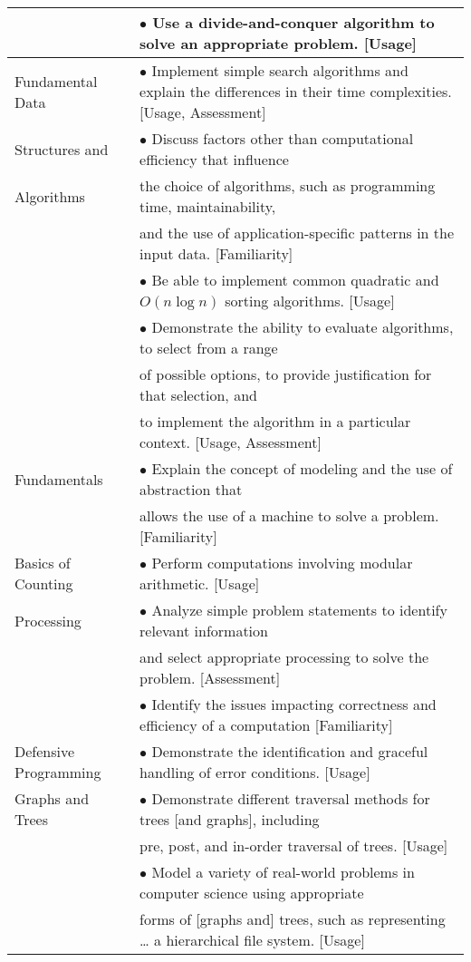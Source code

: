 \documentclass[10pt]{article}
\begin{document}
\begin{longtable}{|p{1.5in}|p{5.25in}|}
 & \(\bullet\) Use a divide-and-conquer algorithm to solve an appropriate problem. [Usage]\\
\hline
Fundamental Data & \(\bullet\) Implement simple search algorithms and explain the differences in their time complexities. [Usage, Assessment]\\
Structures and & \(\bullet\) Discuss factors other than computational efficiency that influence\\
Algorithms & the choice of algorithms, such as programming time, maintainability,\\
 & and the use of application-specific patterns in the input data. [Familiarity]\\
 & \(\bullet\) Be able to implement common quadratic and \(O(n \log n)\) sorting algorithms. [Usage]\\
 & \(\bullet\) Demonstrate the ability to evaluate algorithms, to select from a range\\
 & of possible options, to provide justification for that selection, and\\
 & to implement the algorithm in a particular context. [Usage, Assessment]\\
\hline
Fundamentals & \(\bullet\) Explain the concept of modeling and the use of abstraction that\\
 & allows the use of a machine to solve a problem. [Familiarity]\\
\hline
Basics of Counting & \(\bullet\) Perform computations involving modular arithmetic. [Usage]\\
\hline
Processing & \(\bullet\) Analyze simple problem statements to identify relevant information\\
 & and select appropriate processing to solve the problem. [Assessment]\\
 & \(\bullet\) Identify the issues impacting correctness and efficiency of a computation [Familiarity]\\
\hline
Defensive Programming & \(\bullet\) Demonstrate the identification and graceful handling of error conditions. [Usage]\\
\hline
Graphs and Trees & \(\bullet\) Demonstrate different traversal methods for trees [and graphs], including\\
 & pre, post, and in-order traversal of trees. [Usage]\\
 & \(\bullet\) Model a variety of real-world problems in computer science using appropriate\\
 & forms of [graphs and] trees, such as representing \ldots{} a hierarchical file system. [Usage]\\

\end{longtable}
\end{document}

